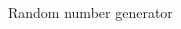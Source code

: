 \begin{frame}
\begin{columns}
\begin{column}{0.5\textwidth}
\begin{block}{Random number generator}
\end{block}


\end{column}

\end{columns}

\end{frame}